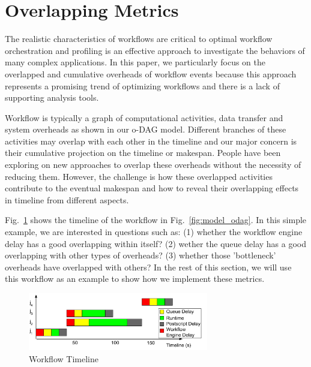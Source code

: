 
\section{Overlapping Metrics}
\label{sec:profiling}

The realistic characteristics of workflows are critical to optimal workflow orchestration and profiling is an effective approach to investigate the behaviors of many complex applications. In this paper, we particularly focus on the overlapped and cumulative overheads of workflow events because this approach represents a promising trend of optimizing workflows and there is a lack of supporting analysis tools.

Workflow is typically a graph of computational activities, data transfer and system overheads as shown in our o-DAG model. Different branches of these activities may overlap with each other in the timeline and our major concern is their cumulative projection on the timeline or makespan. People have been exploring on new approaches to overlap these overheads without the necessity of reducing them. However, the challenge is how these overlapped activities contribute to the eventual makespan and how to reveal their overlapping effects in timeline from different aspects.  


Fig.~\ref{fig:profiling_overhead_timeline} shows the timeline of the workflow in Fig.~\ref{fig:model_odag}. In this simple example, we are interested in questions such as: (1) whether the workflow engine delay has a good overlapping within itself? (2) wether the queue delay has a good overlapping with other types of overheads? (3) whether those 'bottleneck' overheads have overlapped with others? In the rest of this section, we will use this workflow as an example to show how we implement these metrics. 

\begin{figure}[!htb]
	\centering
    \includegraphics[width=0.7\textwidth]{figures/profiling/overhead_timeline.pdf}
    \caption{Workflow Timeline}
    \label{fig:profiling_overhead_timeline}
\end{figure}

